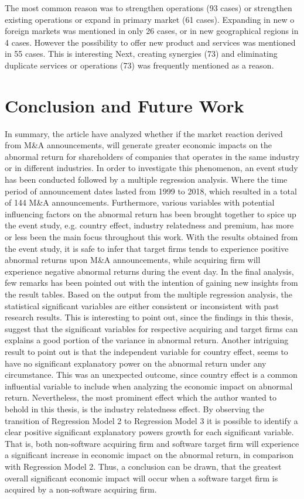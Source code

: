 \documentclass[preprint,10pt]{elsarticle}
\begin{document}
The most common reason was to strengthen operations (93 cases) or strengthen existing operations or expand in primary market (61 cases). Expanding in new o foreign markets was mentioned in only 26 cases, or in new geographical regions in 4 cases. However the possibility to offer new product and services was mentioned in 55 cases. This is interesting  
Next, creating synergies (73) and eliminating duplicate services or operations (73) was frequently mentioned as a reason. 

\section{Conclusion and Future Work}\label{Conclusion}

In summary, the article have analyzed whether if the market reaction derived from M\&A announcements, will generate greater economic impacts on the abnormal return for shareholders of companies that operates in the same industry or in different industries. In order to investigate this phenomenon, an event study has been conducted followed by a multiple regression analysis. Where the time period of announcement dates lasted from 1999 to 2018, which resulted in a total of 144 M\&A announcements. Furthermore, various variables with potential influencing factors on the abnormal return has been brought together to spice up the event study, e.g. country effect, industry relatedness and premium, has more or less been the main focus throughout this work. With the results obtained from the event study, it is safe to infer that target firms tends to experience positive abnormal returns upon M\&A announcements, while acquiring firm will experience negative abnormal returns during the event day.
In the final analysis, few remarks has been pointed out with the intention of gaining new insights from the result tables. Based on the output from the multiple regression analysis, the statistical significant variables are either consistent or inconsistent with past research results. This is interesting to point out, since the findings in this thesis, suggest that the significant variables for respective acquiring and target firms can explains a good portion of the variance in abnormal return. Another intriguing result to point out is that the independent variable for country effect, seems to have no significant explanatory power on the abnormal return under any circumstance. This was an unexpected outcome, since country effect is a common influential variable to include when analyzing the economic impact on abnormal return. Nevertheless, the most prominent effect which the author wanted to behold in this thesis, is the industry relatedness effect. By observing the transition of Regression Model 2 to Regression Model 3 it is possible to identify a clear positive significant explanatory powers growth for each significant variable. That is, both non-software acquiring firm and software target firm will experience a significant increase in economic impact on the abnormal return, in comparison with Regression Model 2. Thus, a conclusion can be drawn, that the greatest overall significant economic impact will occur when a software target firm is acquired by a non-software acquiring firm.
\end{document}
